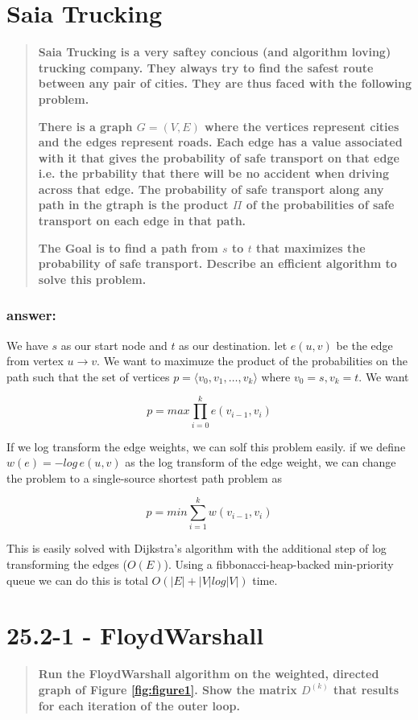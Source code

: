 \documentclass[titlepage]{article}
\theoremstyle{definition}
\begin{document}
\section{Saia Trucking}
\begin{quote}
  \textbf{Saia Trucking is a very saftey concious (and algorithm loving)
  trucking company. They always try to find the safest route between any pair
of cities. They are thus faced with the following problem.}

\textbf{There is a graph $G = (V,E)$ where the vertices represent cities and the edges
represent roads. Each edge has a value associated with it that gives the
probability of safe transport on that edge i.e. the prbability that there will
be no accident when driving across that edge. The probability of safe transport
along any path in the gtraph is the product $\Pi$ of the probabilities of safe
transport on each edge in that path.}

\textbf{The Goal is to find a path from $s$ to $t$ that maximizes the probability of
safe transport. Describe an efficient algorithm to solve this problem.  }
\end{quote}
\subsubsection{answer:}
We have $s$ as our start node and $t$ as our destination. let $e(u,v)$ be the
edge from vertex $u \rightarrow v$. We want to maximuze the product of the
probabilities on the path such that the set of vertices $p = \langle v_0, v_1,
\dots, v_k \rangle$ where $v_0 = s, v_k = t$. We want

\[ p = max \prod_{i = 0}^{k} e(v_{i-1}, v_i) \]

If we log transform the edge weights, we can solf this problem easily. if we
define $w(e) = - log \, e(u,v)$ as the log transform of the edge weight, we can
change the problem to  a single-source shortest path problem as 

\[ p = min \sum_{i=1}^{k} w(v_{i-1}, v_i) \]

This is easily solved with Dijkstra's algorithm with the additional step of log
transforming the edges ($O(E)$). Using a fibbonacci-heap-backed min-priority
queue we can do this is total $O(|E| + |V| log |V|)$ time.


\newpage
\section{25.2-1 - Floyd\textemdash Warshall}
\begin{quote}
  \textbf{Run the Floyd\textemdash Warshall algorithm on the weighted, directed
	graph of Figure \ref{fig:figure1}. Show the matrix $D^{(k)}$ that results for each
	iteration of the outer loop.}
\end{quote}
\end{document}
